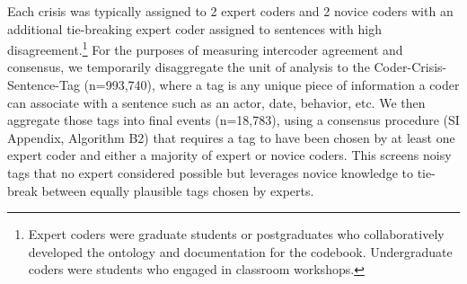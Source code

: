 \documentclass{article}
\begin{document}
\begin{longtable}[c]{|p{0.10in}|p{0.10in}|p{3.00in}|p{0.25in}|p{0.25in}|p{0.25in}|p{0.25in}|p{0.25in}|p{0.25in}|p{0.25in}|p{0.25in}|p{0.25in}}
0.25in+0\tabcolsep+0\arrayrulewidth}}{\fontsize{7}{4}\selectfont{\textcolor[HTML]{000000}{}}} & \multicolumn{1}{!{\color[HTML]{000000}\vrule width 0pt}>{\cellcolor[HTML]{EFEFEF}\centering}p{\dimexpr 0.25in+0\tabcolsep+0\arrayrulewidth}}{\fontsize{7}{4}\selectfont{\textcolor[HTML]{000000}{}}} & \multicolumn{1}{!{\color[HTML]{666666}\vrule width 1pt}>{\cellcolor[HTML]{EFEFEF}\centering}p{\dimexpr 0.25in+0\tabcolsep+0\arrayrulewidth}}{\fontsize{7}{4}\selectfont{\textcolor[HTML]{000000}{}}} & \multicolumn{1}{!{\color[HTML]{000000}\vrule width 0pt}>{\cellcolor[HTML]{EFEFEF}\centering}p{\dimexpr 0.25in+0\tabcolsep+0\arrayrulewidth}}{\fontsize{7}{4}\selectfont{\textcolor[HTML]{000000}{}}} & \multicolumn{1}{!{\color[HTML]{000000}\vrule width 0pt}>{\cellcolor[HTML]{EFEFEF}\centering}p{\dimexpr 0.25in+0\tabcolsep+0\arrayrulewidth}!{\color[HTML]{000000}\vrule width 2pt}}{\fontsize{7}{4}\selectfont{\textcolor[HTML]{000000}{}}} \\

\hhline{>{\arrayrulecolor[HTML]{000000}\global\arrayrulewidth=2pt}->{\arrayrulecolor[HTML]{000000}\global\arrayrulewidth=2pt}->{\arrayrulecolor[HTML]{000000}\global\arrayrulewidth=2pt}->{\arrayrulecolor[HTML]{000000}\global\arrayrulewidth=2pt}->{\arrayrulecolor[HTML]{000000}\global\arrayrulewidth=2pt}->{\arrayrulecolor[HTML]{000000}\global\arrayrulewidth=2pt}->{\arrayrulecolor[HTML]{000000}\global\arrayrulewidth=2pt}->{\arrayrulecolor[HTML]{000000}\global\arrayrulewidth=2pt}->{\arrayrulecolor[HTML]{000000}\global\arrayrulewidth=2pt}->{\arrayrulecolor[HTML]{000000}\global\arrayrulewidth=2pt}->{\arrayrulecolor[HTML]{000000}\global\arrayrulewidth=2pt}->{\arrayrulecolor[HTML]{000000}\global\arrayrulewidth=2pt}-}



\end{longtable}

\clearpage
\twocolumn

Each crisis was typically assigned to 2 expert coders and 2 novice
coders with an additional tie-breaking expert coder assigned to
sentences with high disagreement.\footnote{Expert coders were graduate
  students or postgraduates who collaboratively developed the ontology
  and documentation for the codebook. Undergraduate coders were students
  who engaged in classroom workshops.} For the purposes of measuring
intercoder agreement and consensus, we temporarily disaggregate the unit
of analysis to the Coder-Crisis-Sentence-Tag (n=993,740), where a tag is
any unique piece of information a coder can associate with a sentence
such as an actor, date, behavior, etc. We then aggregate those tags into
final events (n=18,783), using a consensus procedure (SI Appendix,
Algorithm B2) that requires a tag to have been chosen by at least one
expert coder and either a majority of expert or novice coders. This
screens noisy tags that no expert considered possible but leverages
novice knowledge to tie-break between equally plausible tags chosen by
experts.
\end{document}
